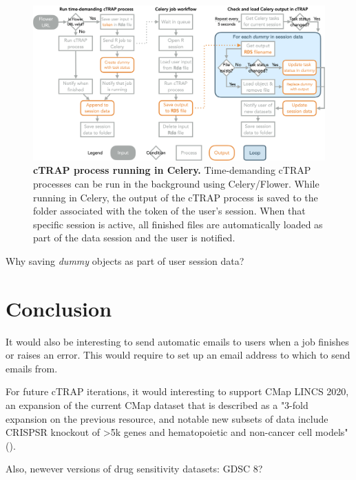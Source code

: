\begin{figure}[!ht]
  \includegraphics[width=\textwidth]{images/ctrap/celery-job}
  \centering
  \caption[cTRAP process running in Celery]{\textbf{cTRAP process running in Celery.} Time-demanding cTRAP processes can be run in the background using Celery/Flower. While running in Celery, the output of the cTRAP process is saved to the folder associated with the token of the user's session. When that specific session is active, all finished files are automatically loaded as part of the data session and the user is notified.}
  \label{fig:ctrap-celery}
\end{figure}

Why saving \emph{dummy} objects as part of user session data?

\section{Conclusion}

It would also be interesting to send automatic emails to users when a job finishes or raises an error. This would require to set up an email address to which to send emails from.

For future cTRAP iterations, it would interesting to support CMap LINCS 2020, an expansion of the current CMap dataset that is described as a "3-fold expansion on the previous resource, and notable new subsets of data include CRISPSR knockout of \textgreater 5k genes and hematopoietic and non-cancer cell models" ().

Also, newever versions of drug sensitivity datasets: GDSC 8?
